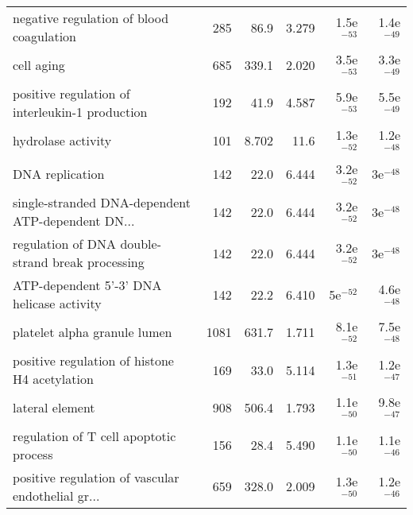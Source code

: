 \begin{longtable}{lrrrrr}
          negative regulation of blood coagulation &                     285 &                    86.9 &      3.279 &         1.5e$^{-53}$ &         1.4e$^{-49}$ \\
                                        cell aging &                     685 &                   339.1 &      2.020 &         3.5e$^{-53}$ &         3.3e$^{-49}$ \\
   positive regulation of interleukin-1 production &                     192 &                    41.9 &      4.587 &         5.9e$^{-53}$ &         5.5e$^{-49}$ \\
                                hydrolase activity &                     101 &                   8.702 &       11.6 &         1.3e$^{-52}$ &         1.2e$^{-48}$ \\
                                   DNA replication &                     142 &                    22.0 &      6.444 &         3.2e$^{-52}$ &           3e$^{-48}$ \\
 single-stranded DNA-dependent ATP-dependent DN... &                     142 &                    22.0 &      6.444 &         3.2e$^{-52}$ &           3e$^{-48}$ \\
  regulation of DNA double-strand break processing &                     142 &                    22.0 &      6.444 &         3.2e$^{-52}$ &           3e$^{-48}$ \\
         ATP-dependent 5'-3' DNA helicase activity &                     142 &                    22.2 &      6.410 &           5e$^{-52}$ &         4.6e$^{-48}$ \\
                      platelet alpha granule lumen &                    1081 &                   631.7 &      1.711 &         8.1e$^{-52}$ &         7.5e$^{-48}$ \\
     positive regulation of histone H4 acetylation &                     169 &                    33.0 &      5.114 &         1.3e$^{-51}$ &         1.2e$^{-47}$ \\
                                   lateral element &                     908 &                   506.4 &      1.793 &         1.1e$^{-50}$ &         9.8e$^{-47}$ \\
            regulation of T cell apoptotic process &                     156 &                    28.4 &      5.490 &         1.1e$^{-50}$ &         1.1e$^{-46}$ \\
 positive regulation of vascular endothelial gr... &                     659 &                   328.0 &      2.009 &         1.3e$^{-50}$ &         1.2e$^{-46}$ \\

\end{longtable}
